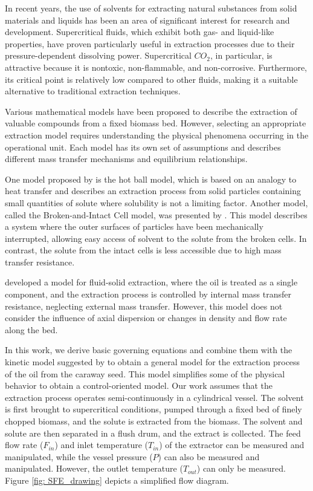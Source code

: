 \documentclass[../Article_Model_Parameters.tex]{subfiles}
\begin{document}
	
	In recent years, the use of solvents for extracting natural substances from solid materials and liquids has been an area of significant interest for research and development. Supercritical fluids, which exhibit both gas- and liquid-like properties, have proven particularly useful in extraction processes due to their pressure-dependent dissolving power. Supercritical $CO_2$, in particular, is attractive because it is nontoxic, non-flammable, and non-corrosive. Furthermore, its critical point is relatively low compared to other fluids, making it a suitable alternative to traditional extraction techniques.
	
	Various mathematical models have been proposed to describe the extraction of valuable compounds from a fixed biomass bed. However, selecting an appropriate extraction model requires understanding the physical phenomena occurring in the operational unit. Each model has its own set of assumptions and describes different mass transfer mechanisms and equilibrium relationships.
	
	One model proposed by \citet{Reverchon1993} is the hot ball model, which is based on an analogy to heat transfer and describes an extraction process from solid particles containing small quantities of solute where solubility is not a limiting factor. Another model, called the Broken-and-Intact Cell model, was presented by \citet{Sovova1994}. This model describes a system where the outer surfaces of particles have been mechanically interrupted, allowing easy access of solvent to the solute from the broken cells. In contrast, the solute from the intact cells is less accessible due to high mass transfer resistance.
	
	\citet{Reverchon1996} developed a model for fluid-solid extraction, where the oil is treated as a single component, and the extraction process is controlled by internal mass transfer resistance, neglecting external mass transfer. However, this model does not consider the influence of axial dispersion or changes in density and flow rate along the bed.
	
	In this work, we derive basic governing equations and combine them with the kinetic model suggested by \citet{Reverchon1996} to obtain a general model for the extraction process of the oil from the caraway seed. This model simplifies some of the physical behavior to obtain a control-oriented model. Our work assumes that the extraction process operates semi-continuously in a cylindrical vessel. The solvent is first brought to supercritical conditions, pumped through a fixed bed of finely chopped biomass, and the solute is extracted from the biomass. The solvent and solute are then separated in a flush drum, and the extract is collected. The feed flow rate ($F_{in}$) and inlet temperature ($T_{in}$) of the extractor can be measured and manipulated, while the vessel pressure ($P$) can also be measured and manipulated. However, the outlet temperature ($T_{out}$) can only be measured. Figure \ref{fig: SFE_drawing} depicts a simplified flow diagram.
	
\end{document}
